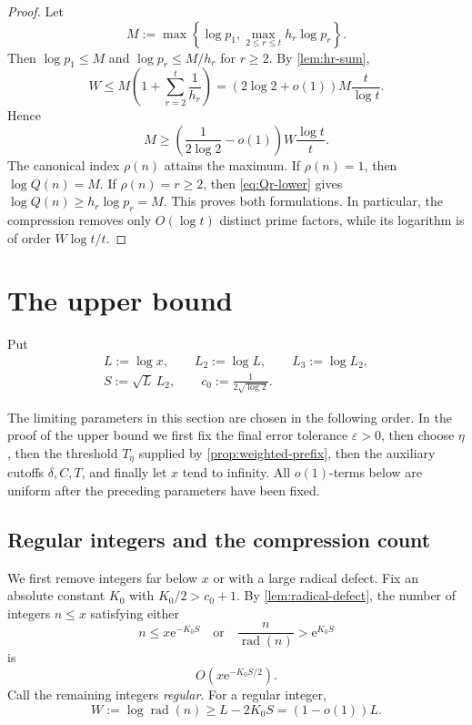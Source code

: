 \documentclass[11pt]{amsart}
\theoremstyle{definition}
\theoremstyle{remark}
\numberwithin{equation}{section}
\newcommand{\rad}{\operatorname{rad}}
\newcommand{\e}{\mathrm e}
\newcommand{\eps}{\varepsilon}
\begin{document}
\begin{proof}
Let
\[
 M:=\max\left\{\log p_1,\max_{2\le r\le t}h_r\log p_r\right\}.
\]
Then $\log p_1\le M$ and $\log p_r\le M/h_r$ for $r\ge2$.  By \cref{lem:hr-sum},
\[
 W\le M\left(1+\sum_{r=2}^t\frac1{h_r}\right)
 =\left(2\log 2+o(1)\right)M\frac t{\log t}.
\]
Hence
\[
 M\ge\left(\frac1{2\log 2}-o(1)\right)W\frac{\log t}{t}.
\]
The canonical index $\rho(n)$ attains the maximum.  If $\rho(n)=1$, then $\log Q(n)=M$.  If $\rho(n)=r\ge2$, then \eqref{eq:Qr-lower} gives $\log Q(n)\ge h_r\log p_r=M$.  This proves both formulations.  In particular, the compression removes
only $O(\log t)$ distinct prime factors, while its logarithm is of order
$W\log t/t$.
\end{proof}

\section{The upper bound}

Put
\begin{equation}\label{eq:L-notation}
 \begin{gathered}
 L:=\log x,\qquad L_2:=\log L,\qquad L_3:=\log L_2,\\
 S:=\sqrt L\,L_2,\qquad c_0:=\frac1{2\sqrt{\log 2}}.
 \end{gathered}
\end{equation}

The limiting parameters in this section are chosen in the following order.
In the proof of the upper bound we first fix the final error tolerance
$\eps>0$, then choose $\eta$, then the threshold $T_\eta$ supplied by
\cref{prop:weighted-prefix}, then the auxiliary cutoffs $\delta,C,T$, and
finally let $x$ tend to infinity.  All $o(1)$-terms below are uniform after
the preceding parameters have been fixed.

\subsection{Regular integers and the compression count}

We first remove integers far below $x$ or with a large radical defect.  Fix an absolute constant $K_0$ with $K_0/2>c_0+1$.  By \cref{lem:radical-defect}, the number of integers $n\le x$ satisfying either
\[
 n\le x\e^{-K_0S}
 \quad\text{or}\quad
 \frac n{\rad(n)}>\e^{K_0S}
\]
is
\begin{equation}\label{eq:irregular}
 O(x\e^{-K_0S/2}).
\end{equation}
Call the remaining integers \emph{regular}.  For a regular integer,
\begin{equation}\label{eq:regular-radical}
 W:=\log\rad(n)\ge L-2K_0S=(1-o(1))L.
\end{equation}
\end{document}
